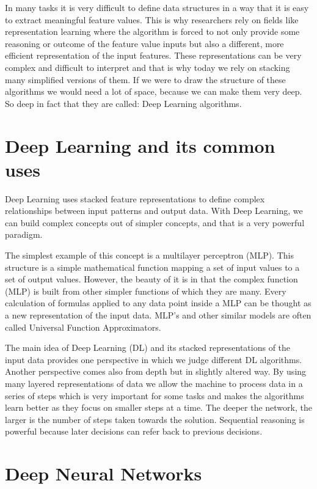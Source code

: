 \documentclass[b5paper]{book}
\begin{document}
In many tasks it is very difficult to define data structures in a way that it is easy to extract meaningful feature values. This is why researchers rely on fields like representation learning where the algorithm is forced to not only provide some reasoning or outcome of the feature value inputs but also a different, more efficient representation of the input features. These representations can be very complex and difficult to interpret and that is why today we rely on stacking many simplified versions of them. If we were to draw the structure of these algorithms we would need a lot of space, because we can make them very deep. So deep in fact that they are called: Deep Learning algorithms.

\section{Deep Learning and its common uses}

Deep Learning uses stacked feature representations to define complex relationships between input patterns and output data. With Deep Learning, we can build complex concepts out of simpler concepts, and that is a very powerful paradigm. 

The simplest example of this concept is a multilayer perceptron (MLP). This structure is a simple mathematical function mapping a set of input values to a set of output values. However, the beauty of it is in that the complex function (MLP) is built from other simpler functions of which they are many. Every calculation of formulas applied to any data point inside a MLP can be thought as a new representation of the input data. MLP's and other similar models are often called Universal Function Approximators. 

The main idea of Deep Learning (DL) and its stacked representations of the input data provides one perspective in which we judge different DL algorithms. Another perspective comes also from depth but in slightly altered way. By using many layered representations of data we allow the machine to process data in a series of steps which is very important for some tasks and makes the algorithms learn better as they focus on smaller steps at a time. The deeper the network, the larger is the number of steps taken towards the solution. Sequential reasoning is powerful because later decisions can refer back to previous decisions. 


\section{Deep Neural Networks}
\end{document}
